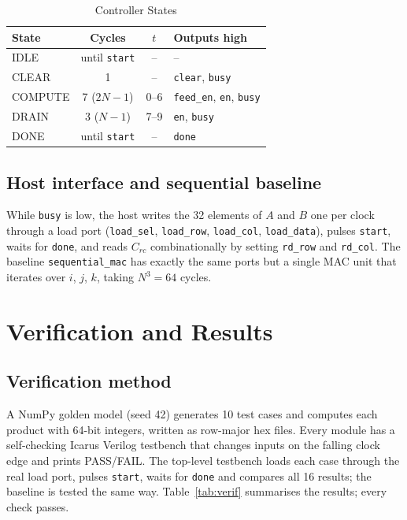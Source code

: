 \documentclass[conference]{IEEEtran}
\newcommand{\code}[1]{\texttt{#1}}
\begin{document}
\begin{table}[t]
  \centering
  \caption{Controller States}
  \label{tab:fsm}
  \footnotesize
  \setlength{\tabcolsep}{4pt}
  \begin{tabular}{@{}l c c l@{}}
    \toprule
    State & Cycles & $t$ & Outputs high \\
    \midrule
    IDLE    & until \code{start} & -- & -- \\
    CLEAR   & 1 & -- & \code{clear}, \code{busy} \\
    COMPUTE & 7 ($2N-1$) & 0--6 & \code{feed\_en}, \code{en}, \code{busy} \\
    DRAIN   & 3 ($N-1$) & 7--9 & \code{en}, \code{busy} \\
    DONE    & until \code{start} & -- & \code{done} \\
    \bottomrule
  \end{tabular}
\end{table}

\subsection{Host interface and sequential baseline}
While \code{busy} is low, the host writes the 32 elements of $A$ and $B$ one
per clock through a load port (\code{load\_sel}, \code{load\_row},
\code{load\_col}, \code{load\_data}), pulses \code{start}, waits for
\code{done}, and reads $C_{rc}$ combinationally by setting \code{rd\_row} and
\code{rd\_col}. The baseline \code{sequential\_mac} has exactly the same ports
but a single MAC unit that iterates over $i$, $j$, $k$, taking $N^3 = 64$
cycles.

\section{Verification and Results}\label{sec:results}

\subsection{Verification method}
A NumPy golden model (seed 42) generates 10 test cases and computes each
product with 64-bit integers, written as row-major hex files. Every module has
a self-checking Icarus Verilog testbench that changes inputs on the falling
clock edge and prints PASS/FAIL. The top-level testbench loads each case through
the real load port, pulses \code{start}, waits for \code{done} and compares all
16 results; the baseline is tested the same way. Table~\ref{tab:verif}
summarises the results; every check passes.
\end{document}
